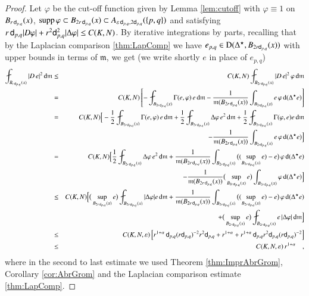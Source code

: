 \documentclass[11pt,reqno]{amsart}
\newcommand{\supp}{\mathop{\rm supp}\nolimits}
\newcommand{\dom}{\rm D}
\newcommand{\mm}{\mathfrak m}
\newcommand{\sfd}{{\sf d}}
\renewcommand{\d}{{\rm{d}}}
\newcommand{\vare}{\varepsilon}
\theoremstyle{definition}
\theoremstyle{remark}
\theoremstyle{remark}
\theoremstyle{remark}
\theoremstyle{remark}
\theoremstyle{remark}
\theoremstyle{remark}
\theoremstyle{remark}
\begin{document}
\begin{proof} Let $\varphi$ be the cut-off function given by Lemma \ref{lem:cutoff} with $\varphi\equiv 1$ on $B_{r\, \sfd_{p,q}}(x)$,  $\supp \varphi \subset B_{2r \,\sfd_{p,q}}(x)\subset A_{\varepsilon \, \sfd_{p,q}, 2 \sfd_{p,q}}(\{p,q\})$ and satisfying $r \,\sfd_{p,q} |D \varphi|+r^2 \sfd_{p,q}^2 |\Delta \varphi|\leq C(K,N)$. By iterative integrations by parts, recalling that by the Laplacian comparison \ref{thm:LapComp} we have $e_{p,q} \in {\dom}(\Delta^\star, B_{2r \sfd_{p,q}}(x))$ with upper bounds in terms of $\mm$,  we get (we write shortly $e$ in place of $e_{p,q}$)
\begin{eqnarray}
\fint_{B_{r\, \sfd_{p,q}}(x)} |D \,e|^2\, \d \mm &\leq& C(K,N) \fint_{B_{2r\, \sfd_{p,q}}(x)} |D \,e|^2\, \varphi \, \d \mm  \nonumber \\
&=&  C(K,N) \left[- \fint_{B_{2r\, \sfd_{p,q}}(x)} \Gamma(e,\varphi) \,e \, \d \mm - \frac{1}{\mm(B_{2r\, \sfd_{p,q}}(x))} \int_{B_{2r \sfd_{p,q}}(x)}  e \, \varphi \,  \d(\Delta^\star e) \right] \nonumber \\
&=& C(K,N) \Big[ -\frac{1}{2} \fint_{B_{2r\, \sfd_{p,q}}(x)} \Gamma(e,\varphi) \,e  \, \d\mm +  \frac{1}{2} \fint_{B_{2r\, \sfd_{p,q}}(x)} \Delta \varphi \,e^2  \, \d\mm + \frac{1}{2} \fint_{B_{2r\, \sfd_{p,q}}(x)} \Gamma(\varphi, e) e  \, \d\mm \nonumber \\
&& \quad \quad \quad \quad - \frac{1}{\mm(B_{2r\, \sfd_{p,q}}(x))} \int_{B_{2r \sfd_{p,q}}(x)}  e \, \varphi \,  \d(\Delta^\star e) \Big] \nonumber\\
&=& C(K,N) \Big[ \frac{1}{2} \fint_{B_{2r\, \sfd_{p,q}}(x)} \Delta \varphi \,e^2  \, \d\mm  +  \frac{1}{\mm(B_{2r\, \sfd_{p,q}}(x))} \int_{B_{2r\, \sfd_{p,q}}(x)} \big((\sup_{B_{2r\, \sfd_{p,q}}(x)} e)-e\big) \, \varphi \, \d(\Delta^\star e) \nonumber\\
&&\quad \quad \quad \quad  -   \frac{1}{\mm(B_{2r\, \sfd_{p,q}}(x))} \big(\sup_{B_{2r\, \sfd_{p,q}}(x)} e\big)     \int_{B_{2r\, \sfd_{p,q}}(x)} \varphi \, \d(\Delta^\star e)  \Big] \nonumber\\
&\leq& C(K,N)     \Big[ \big(\sup_{B_{2r\, \sfd_{p,q}}(x)} e\big) \fint_{B_{2r\, \sfd_{p,q}}(x)} |\Delta \varphi| e \, \d\mm +  \frac{1}{\mm(B_{2r\, \sfd_{p,q}}(x))} \int_{B_{2r\, \sfd_{p,q}}(x)} \big((\sup_{B_{2r\, \sfd_{p,q}}(x)} e)-e\big) \, \varphi \, \d(\Delta^\star e) \nonumber\\
&&\quad \quad \quad \quad  +  \big(\sup_{B_{2r\, \sfd_{p,q}}(x)} e \big)  \fint_{B_{2r\, \sfd_{p,q}}(x)}  e \, |\Delta \varphi |\, \d\mm  \Big] \nonumber\\
&\leq& C(K,N,\vare)     \left[ r^{1+\alpha}\, \sfd_{p,q} (r \sfd_{p,q})^{-2} r^2 \sfd_{p,q}+   r^{1+\alpha}  + r^{1+\alpha}\, \sfd_{p,q}   r^2 \sfd_{p,q} (r \sfd_{p,q})^{-2} \right] \nonumber \\
&\leq&  C(K,N,\vare)  \, r^{1+\alpha}\quad,  
\end{eqnarray}
where in the second to last estimate we used Theorem \ref{thm:ImprAbrGrom}, Corollary \ref{cor:AbrGrom} and the Laplacian comparison estimate \ref{thm:LapComp}.
\end{proof}
\end{document}
